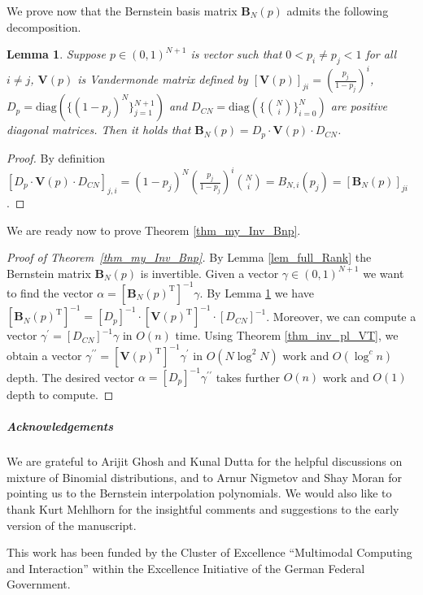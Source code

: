 \documentclass[11pt]{article}
\newcommand{\Vp}{\mathbf{V}(p)}
\newcommand{\mB}{\mathbf{B}}
\newcommand{\mBNp}{\mathbf{B}_{N}(p)}
\newcommand{\diag}{\mathrm{diag}}
\newcommand{\prm}{\prime}
\newcommand{\rot}{\mathrm{T}}
\newtheorem{lem}[thm]{Lemma}
\numberwithin{thm}{section}
\begin{document}
We prove now that the Bernstein basis matrix $\mB_{N}(p)$ admits the following decomposition.

\begin{lem}
\label{lem_BB_DVpD} Suppose $p\in(0,1)^{N+1}$ is vector
such that $0<p_{i}\neq p_{j}<1$ for all $i\neq j$, $\Vp$
is Vandermonde matrix defined by $[\Vp]_{ji}=(\frac{p_{j}}{1-p_{j}})^i$,
$D_{p}=\diag(\{ (1-p_{j})^{N}\} {}_{j=1}^{N+1})$
and $D_{CN}=\diag(\{ {N \choose i}\} _{i=0}^{N})$
are positive diagonal matrices. Then it holds that $\mBNp =D_{p}\cdot\Vp\cdot D_{CN}$.\end{lem}
\begin{proof}
By definition $[D_{p}\cdot\Vp\cdot D_{CN}]_{j,i} = (1-p_{j})^{N}(\frac{p_{j}}{1-p_{j}})^{i}{N \choose i} = B_{N,i}(p_{j}) = [\mB_{N}(p)]_{ji} $.
\end{proof}

We are ready now to prove Theorem \ref{thm_my_Inv_Bnp}.

\begin{proof}[Proof of Theorem~\ref{thm_my_Inv_Bnp}] By Lemma \ref{lem_full_Rank} the Bernstein matrix $\mBNp$ is invertible. Given a vector
$\gamma\in(0,1)^{N+1}$ we want to find the vector $\alpha=[\mBNp^{\rot}]^{-1}\gamma$.
By Lemma \ref{lem_BB_DVpD} we have $[\mBNp^{\rot}]^{-1} = [D_{p}]^{-1}\cdot[\Vp^{\rot}]^{-1}\cdot[D_{CN}]^{-1}$. Moreover, we can compute a vector $\gamma^{\prm}=[D_{CN}]^{-1}\gamma$
in $O(n)$ time. Using Theorem \ref{thm_inv_pl_VT}, we obtain a vector
 $\gamma^{\prm\prm}=[\Vp^{\rot}]^{-1}\gamma^{\prm}$
in $O(N\log^{2}N)$ work and $O(\log^{c}n)$ depth. The desired vector $\alpha=[D_{p}]^{-1}\gamma^{\prm\prm}$
takes further $O(n)$ work and $O(1)$ depth to compute.
\end{proof}


\subparagraph*{Acknowledgements}

We are grateful to Arijit Ghosh and Kunal Dutta for the helpful discussions on mixture of Binomial distributions, and to Arnur Nigmetov and Shay Moran for pointing us to the Bernstein interpolation polynomials. We would also like to thank Kurt Mehlhorn for the insightful comments and suggestions to the early version of the manuscript.

This work has been funded by the Cluster of Excellence ``Multimodal Computing and Interaction'' within the Excellence Initiative of the German Federal Government.
\end{document}
